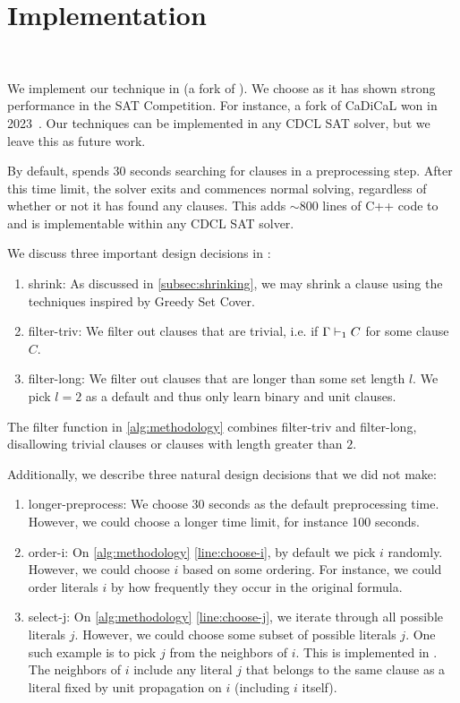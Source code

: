 \section{Implementation}~\label{sec:implementation}

We implement our technique in \tool (a fork of \cadical
). We choose \cadical as it has shown strong performance in the SAT Competition.
For instance, a fork of CaDiCaL won in 2023~\cite{satcomp2023}. Our techniques
can be implemented in any CDCL SAT solver, but we leave this as future work.

By default, \tool spends 30 seconds searching for \pr clauses in a preprocessing step. After this time limit, the solver exits and commences normal solving,
regardless of whether or not it has found any \pr clauses. This adds $\sim\!800$ lines
of C++ code to \cadical and is implementable within any CDCL SAT solver.

We discuss three important design decisions in \tool:

\begin{enumerate}
  \item \textsf{shrink}: As discussed in \autoref{subsec:shrinking}, we may
  shrink a clause using the techniques inspired by Greedy Set Cover.
  \item \textsf{filter-triv}: We filter out clauses that are trivial, i.e. if
  $\Gamma \vdash_1 C$ for some clause $C$.
  \item \textsf{filter-long}: We filter out clauses that are longer than some
  set length $l$. We pick $l = 2$ as a default and thus only learn binary and unit
  clauses.
\end{enumerate}

The filter function in \autoref{alg:methodology} combines \textsf{filter-triv} and \textsf{filter-long},
disallowing trivial clauses or clauses with length greater than $2$.

Additionally, we describe three natural design decisions that we did not make:

\begin{enumerate}
  \item \textsf{longer-preprocess}: We choose 30 seconds as the default
  preprocessing time. However, we could choose a longer time limit, for instance
  100 seconds.
  \item \textsf{order-i}: On \autoref{alg:methodology} \autoref{line:choose-i},
  by default we pick $i$ randomly. However, we could choose $i$ based
  on some ordering. For instance, we could order literals $i$ by how frequently
  they occur in the original formula.
  \item \textsf{select-j}: On \autoref{alg:methodology} \autoref{line:choose-j},
  we iterate through all possible literals $j$. However, we
  could choose some subset of possible literals $j$. One such example is to pick $j$ from 
  the neighbors of $i$. This is implemented in \prelearn.
  The neighbors of $i$ include any literal $j$ that belongs to the same clause as
  a literal fixed by unit propagation on $i$ (including $i$ itself).
\end{enumerate}

